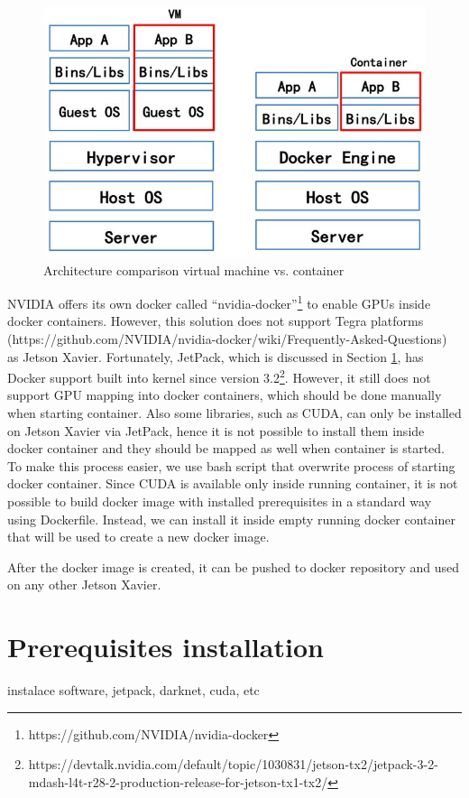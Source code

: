 \documentclass[twoside]{ctuthesis}
\theoremstyle{plain}
\theoremstyle{definition}
\theoremstyle{note}
\begin{document}
\begin{figure}[hbt]
\caption{Architecture comparison virtual machine vs. container\cite{zhang_liu_pu_dou_wu_zhou_2018}}
\label{fig:vm_containers}
\includegraphics[width=.8\textwidth]{images/implementation/vm_containers.png}
\end{figure}

NVIDIA offers its own docker called ``nvidia-docker''\footnote{https://github.com/NVIDIA/nvidia-docker} to enable GPUs inside docker containers. However, this solution does not support Tegra platforms (https://github.com/NVIDIA/nvidia-docker/wiki/Frequently-Asked-Questions) as Jetson Xavier. Fortunately, JetPack, which is discussed in Section \ref{section:prerequisites}, has Docker support built into kernel since version 3.2\footnote{https://devtalk.nvidia.com/default/topic/1030831/jetson-tx2/jetpack-3-2-mdash-l4t-r28-2-production-release-for-jetson-tx1-tx2/}. However, it still does not support GPU mapping into docker containers, which should be done manually when starting container. Also some libraries, such as CUDA, can only be installed on Jetson Xavier via JetPack, hence it is not possible to install them inside docker container and they should be mapped as well when container is started. To make this process easier, we use bash script that overwrite process of starting docker container. Since CUDA is available only inside running container, it is not possible to build docker image with installed prerequisites in a standard way using Dockerfile. Instead, we can install it inside empty running docker container that will be used to create a new docker image.

After the docker image is created, it can be pushed to docker repository and used on any other Jetson Xavier.

\section{Prerequisites installation}
\label{section:prerequisites}
instalace software, jetpack, darknet, cuda, etc
\end{document}
